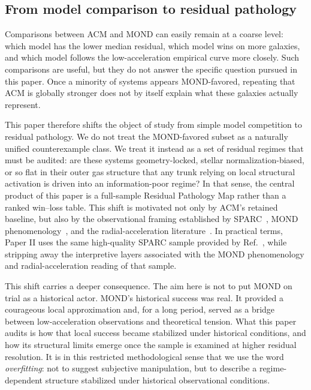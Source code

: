 ﻿\documentclass[aps,prd,twocolumn,superscriptaddress,longbibliography,nofootinbib,floatfix,10pt]{revtex4-2}
\begin{document}
\subsection{From model comparison to residual pathology}

Comparisons between ACM and MOND can easily remain at a coarse level: which
model has the lower median residual, which model wins on more galaxies, and
which model follows the low-acceleration empirical curve more closely. Such
comparisons are useful, but they do not answer the specific question pursued in
this paper. Once a minority of systems appears MOND-favored, repeating that ACM
is globally stronger does not by itself explain what these galaxies actually
represent.

This paper therefore shifts the object of study from simple model competition
to residual pathology. We do not treat the MOND-favored subset as a naturally
unified counterexample class. We treat it instead as a set of residual regimes
that must be audited: are these systems geometry-locked, stellar
normalization-biased, or so flat in their outer gas structure that any trunk
relying on local structural activation is driven into an information-poor
regime? In that sense, the central product of this paper is a full-sample
Residual Pathology Map rather than a ranked win--loss table. This shift is motivated
not only by ACM's retained baseline, but also by the observational framing
established by SPARC~\cite{LelliMcGaughSchombert2016SPARC}, MOND
phenomenology~\cite{FamaeyMcGaugh2012}, and the radial-acceleration
literature~\cite{McGaughLelliSchombert2016RAR}. In practical terms, Paper II
uses the same high-quality SPARC sample provided by
Ref.~, while stripping away the
interpretive layers associated with the MOND phenomenology and
radial-acceleration reading of that sample.

This shift carries a deeper consequence. The aim here is not to put MOND on
trial as a historical actor. MOND's historical success was real. It provided a
courageous local approximation and, for a long period, served as a bridge
between low-acceleration observations and theoretical tension. What this paper
audits is how that local success became stabilized under historical
conditions, and how its structural limits emerge once the sample is examined at
higher residual resolution. It is in this restricted methodological sense that
we use the word \emph{overfitting}: not to suggest subjective manipulation, but
to describe a regime-dependent structure stabilized under historical
observational conditions.
\end{document}
